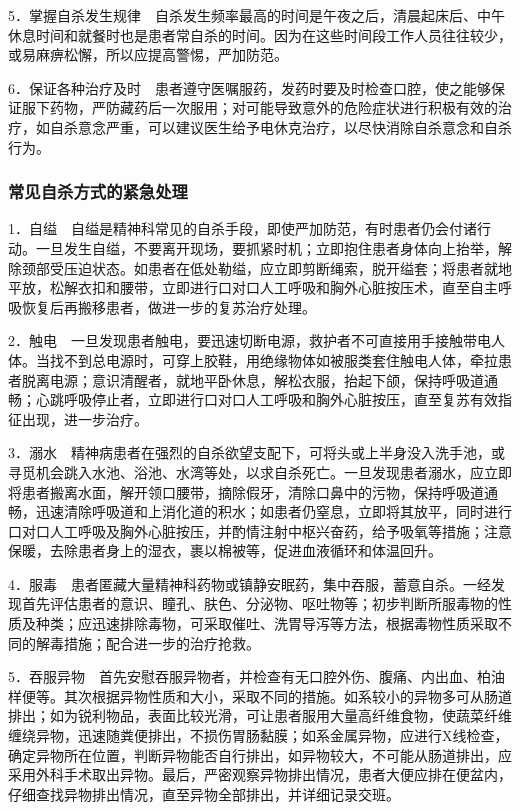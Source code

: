 5．掌握自杀发生规律　自杀发生频率最高的时间是午夜之后，清晨起床后、中午休息时间和就餐时也是患者常自杀的时间。因为在这些时间段工作人员往往较少，或易麻痹松懈，所以应提高警惕，严加防范。

6．保证各种治疗及时　患者遵守医嘱服药，发药时要及时检查口腔，使之能够保证服下药物，严防藏药后一次服用；对可能导致意外的危险症状进行积极有效的治疗，如自杀意念严重，可以建议医生给予电休克治疗，以尽快消除自杀意念和自杀行为。

\subsubsection{常见自杀方式的紧急处理}

1．自缢　自缢是精神科常见的自杀手段，即使严加防范，有时患者仍会付诸行动。一旦发生自缢，不要离开现场，要抓紧时机；立即抱住患者身体向上抬举，解除颈部受压迫状态。如患者在低处勒缢，应立即剪断绳索，脱开缢套；将患者就地平放，松解衣扣和腰带，立即进行口对口人工呼吸和胸外心脏按压术，直至自主呼吸恢复后再搬移患者，做进一步的复苏治疗处理。

2．触电　一旦发现患者触电，要迅速切断电源，救护者不可直接用手接触带电人体。当找不到总电源时，可穿上胶鞋，用绝缘物体如被服类套住触电人体，牵拉患者脱离电源；意识清醒者，就地平卧休息，解松衣服，抬起下颌，保持呼吸道通畅；心跳呼吸停止者，立即进行口对口人工呼吸和胸外心脏按压，直至复苏有效指征出现，进一步治疗。

3．溺水　精神病患者在强烈的自杀欲望支配下，可将头或上半身没入洗手池，或寻觅机会跳入水池、浴池、水湾等处，以求自杀死亡。一旦发现患者溺水，应立即将患者搬离水面，解开领口腰带，摘除假牙，清除口鼻中的污物，保持呼吸道通畅，迅速清除呼吸道和上消化道的积水；如患者仍窒息，立即将其放平，同时进行口对口人工呼吸及胸外心脏按压，并酌情注射中枢兴奋药，给予吸氧等措施；注意保暖，去除患者身上的湿衣，裹以棉被等，促进血液循环和体温回升。

4．服毒　患者匿藏大量精神科药物或镇静安眠药，集中吞服，蓄意自杀。一经发现首先评估患者的意识、瞳孔、肤色、分泌物、呕吐物等；初步判断所服毒物的性质及种类；应迅速排除毒物，可采取催吐、洗胃导泻等方法，根据毒物性质采取不同的解毒措施；配合进一步的治疗抢救。

5．吞服异物　首先安慰吞服异物者，并检查有无口腔外伤、腹痛、内出血、柏油样便等。其次根据异物性质和大小，采取不同的措施。如系较小的异物多可从肠道排出；如为锐利物品，表面比较光滑，可让患者服用大量高纤维食物，使蔬菜纤维缠绕异物，迅速随粪便排出，不损伤胃肠黏膜；如系金属异物，应进行X线检查，确定异物所在位置，判断异物能否自行排出，如异物较大，不可能从肠道排出，应采用外科手术取出异物。最后，严密观察异物排出情况，患者大便应排在便盆内，仔细查找异物排出情况，直至异物全部排出，并详细记录交班。

